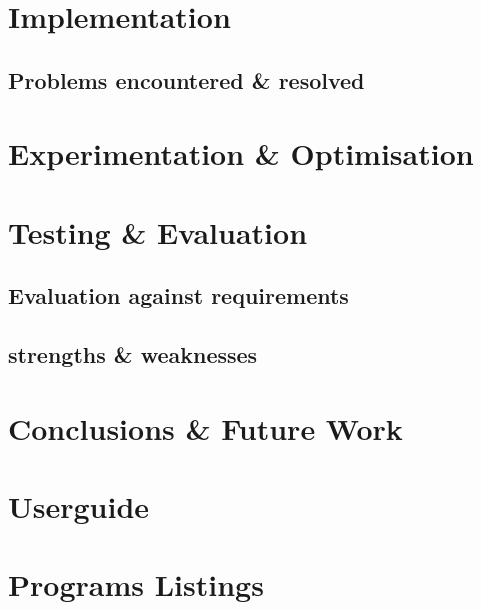 \documentclass[11pt]{report}
\begin{document}
\chapter{Implementation}
\section{Problems encountered \& resolved}

\chapter{Experimentation \& Optimisation}

\chapter{Testing \& Evaluation}
\section{Evaluation against requirements}
\section{strengths \& weaknesses}

\chapter{Conclusions \& Future Work}

\chapter{Userguide}

\chapter{Programs Listings}


\end{document}
